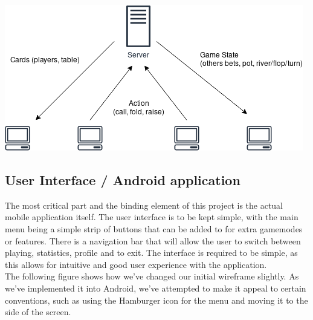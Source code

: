\documentclass[11pt]{article}
\begin{document}
\begin{center}
\includegraphics[scale=0.65]{server_diag}
\end{center}

\newpage
\subsection{User Interface / Android application}

The most critical part and the binding element of this project is the actual mobile application itself. The user interface is to be kept simple, with the main menu being a simple strip of buttons that can be added to for extra gamemodes or features. There is a navigation bar that will allow the user to switch between playing, statistics, profile and to exit. 
The interface is required to be simple, as this allows for intuitive and good user experience with the application. \\

The following figure shows how we've changed our initial wireframe slightly. As we've implemented it into Android, we've attempted to make it appeal to certain conventions, such as using the Hamburger icon for the menu and moving it to the side of the screen.
\end{document}
